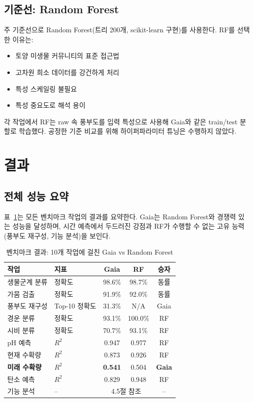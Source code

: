 \documentclass[11pt,a4paper]{article}
\begin{document}
\subsection{기준선: Random Forest}

주 기준선으로 Random Forest(트리 200개, scikit-learn 구현)를 사용한다. RF를 선택한 이유는:

\begin{itemize}[leftmargin=1.5em]
    \item 토양 미생물 커뮤니티의 표준 접근법
    \item 고차원 희소 데이터를 강건하게 처리
    \item 특성 스케일링 불필요
    \item 특성 중요도로 해석 용이
\end{itemize}

각 작업에서 RF는 raw 속 풍부도를 입력 특성으로 사용해 Gaia와 같은 train/test 분할로 학습했다. 공정한 기준 비교를 위해 하이퍼파라미터 튜닝은 수행하지 않았다.

\section{결과}

\subsection{전체 성능 요약}

표~\ref{tab:results}는 모든 벤치마크 작업의 결과를 요약한다. Gaia는 Random Forest와 경쟁력 있는 성능을 달성하며, 시간 예측에서 두드러진 강점과 RF가 수행할 수 없는 고유 능력(풍부도 재구성, 기능 분석)을 보인다.

\begin{table}[H]
\centering
\caption{벤치마크 결과: 10개 작업에 걸친 Gaia vs Random Forest}
\label{tab:results}
\begin{tabular}{llccc}
\toprule
\textbf{작업} & \textbf{지표} & \textbf{Gaia} & \textbf{RF} & \textbf{승자} \\
\midrule
생물군계 분류 & 정확도 & 98.6\% & 98.7\% & 동률 \\
가뭄 검출 & 정확도 & 91.9\% & 92.0\% & 동률 \\
풍부도 재구성 & Top-10 정확도 & 31.3\% & N/A & Gaia \\
경운 분류 & 정확도 & 93.1\% & 100.0\% & RF \\
시비 분류 & 정확도 & 70.7\% & 93.1\% & RF \\
pH 예측 & $R^2$ & 0.947 & 0.977 & RF \\
현재 수확량 & $R^2$ & 0.873 & 0.926 & RF \\
\textbf{미래 수확량} & $R^2$ & \textbf{0.541} & 0.504 & \textbf{Gaia} \\
탄소 예측 & $R^2$ & 0.829 & 0.948 & RF \\
기능 분석 & -- & \multicolumn{2}{c}{4.5절 참조} & -- \\
\bottomrule
\end{tabular}
\end{table}
\end{document}
